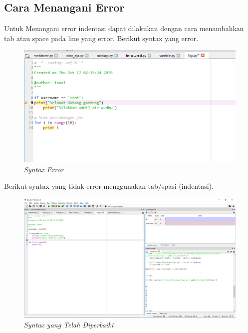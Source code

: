 \subsection{Cara Menangani Error}
Untuk Menangani error indentasi dapat dilakukan dengan cara menambahkan tab atau space pada line yang error.
Berikut syntax yang error.
\begin{figure}[H]
    \centering
    \includegraphics[scale=0.4]{figures/indentasi}
    \caption{\textit{Syntax Error}}
    \label{Syntax Error}
\end{figure}
Berikut syntax yang tidak error menggunakan tab/spasi (indentasi).
\begin{figure}[H]
    \centering
    \includegraphics[scale=0.2]{figures/indentasicoy}
    \caption{\textit{Syntax yang Telah Diperbaiki}}
    \label{Syntax Error}
\end{figure}